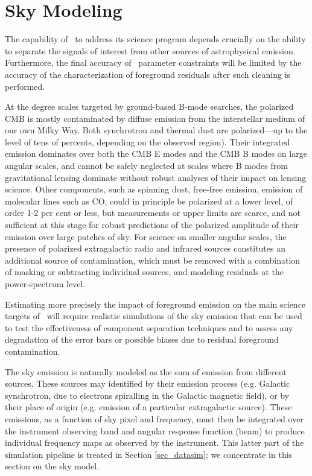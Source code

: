 
\section{Sky Modeling}
\label{sec:skymodel}

The capability of \cmbexp\ to address its science program depends crucially on the ability to separate the signals of interest from other sources of astrophysical emission. Furthermore, the final accuracy of \cmbexp\ parameter constraints will be limited by the accuracy of the characterization of foreground residuals after such cleaning is performed. 

At the degree scales targeted by ground-based B-mode searches, the polarized CMB is mostly contaminated by diffuse emission from the interstellar medium of our own Milky Way. Both synchrotron and thermal dust are polarized---up to the level of tens of percents, depending on the observed region). Their integrated emission dominates over both the CMB E modes and the CMB B modes on large angular scales, and cannot be safely neglected at scales where B modes from gravitational lensing dominate without robust analyses of their impact on lensing science. Other components, such as spinning dust, free-free emission, emission of molecular lines such as CO, could in principle be polarized at a lower level, of order 1-2 per cent or less, but measurements or upper limits are scarce, and not sufficient at this stage for robust predictions of the polarized amplitude of their emission over large patches of sky. For science on smaller angular scales, the presence of polarized extragalactic radio and infrared sources constitutes an additional source of contamination, which must be removed with a combination of masking or subtracting individual sources, and modeling residuals at the power-spectrum level.

Estimating more precisely the impact of foreground emission on the main science targets of \cmbexp\ will require realistic simulations of the sky emission that can be used to test the effectiveness of component separation techniques and to assess any degradation of the error bars or possible biases due to residual foreground contamination. 

The sky emission is naturally modeled as the sum of emission from different sources. These sources may identified by their emission process (e.g. Galactic synchrotron, due to electrons spiralling in the Galactic magnetic field), or by their place of origin (e.g. emission of a particular extragalactic source). These emissions, as a function of sky pixel and frequency, must then be integrated over the instrument observing band and angular response function (beam) to produce individual frequency maps as observed by the instrument. 
This latter part of the simulation pipeline is treated in Section \ref{sec_datasim}; we concentrate in this section on the sky model.

